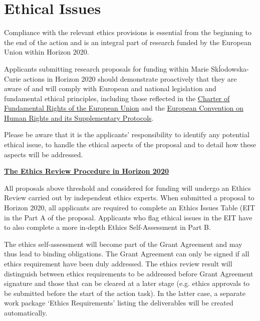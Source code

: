 \section{Ethical Issues}
\label{sec:ethics}

Compliance with the relevant ethics provisions is essential from
the beginning to the end of the action and is an integral part of
research funded by the European Union within Horizon 2020. 

\medskip\noindent
Applicants submitting research proposals for funding within Marie
Sk\'{l}odowska-Curie actions in Horizon 2020 should demonstrate
proactively that they are aware of and will comply with European
and national legislation and fundamental ethical principles,
including those reflected in the
\href{http://www.europarl.europa.eu/charter/pdf/text_en.pdf}{Charter
of Fundamental Rights of the European Union} and the
\href{http://www.echr.coe.int/Documents/Convention_ENG.pdf}{European
Convention on Human Rights and its Supplementary Protocols}.

\medskip\noindent 
Please be aware that it is the applicants' responsibility to
identify any potential ethical issue, to handle the ethical
aspects of the proposal and to detail how these aspects will be
addressed.

\bigskip\noindent
{\large {\bf \ul{The Ethics Review Procedure in Horizon 2020}}}

\medskip\noindent
All proposals above threshold and considered for funding will
undergo an Ethics Review carried out by independent ethics
experts.  When submitted a proposal to Horizon 2020, all
applicants are required to complete an Ethics Issues Table (EIT in
the Part A of the proposal.  Applicants who flag ethical issues in
the EIT have to also complete a more in-depth Ethics
Self-Assessment in Part B.

\medskip\noindent

The ethics self-assessment will become part of the Grant Agreement
and may thus lead to binding obligations. The Grant Agreement can
only be signed if all ethics requirement have been duly addressed.
The ethics review result will distinguish between ethics
requirements to be addressed before Grant Agreement signature and
those that can be cleared at a later stage (e.g. ethics approvals
to be submitted before the start of the action task). In the
latter case, a separate work package ‘Ethics Requirements’ listing
the deliverables will be created automatically.

\medskip\noindent

